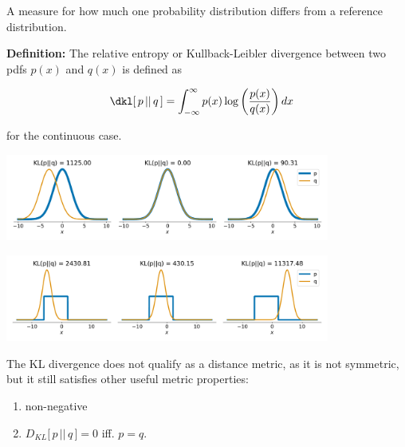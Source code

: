 \begin{frame}{\subsecname}

A measure for how much one probability distribution differs from a reference distribution. 

\textbf{Definition:} 
The relative entropy or Kullback-Leibler divergence between two pdfs $p(x)$ and $q(x)$ is defined as



\begin{align}
\label{eq:klcont}
\dkl\lbrack\,p\, ||\, q\,\rbrack 
&= \int_{-\infty}^{\infty} p(x) \log \left( \frac{p(x)}{q(x)} \right) dx
\end{align}

for the continuous case.

\end{frame}

\begin{frame}{\subsecname}

\begin{center}
	\includegraphics[width=0.8\textwidth]{img/kl_normal}
	
	\pause
	
	\includegraphics[width=0.8\textwidth]{img/kl_uniform_normal}
\end{center}

\pause 

The KL divergence does not qualify as a distance metric, as it is not symmetric, but it still satisfies other useful metric properties:
\begin{enumerate}
\item non-negative
\item $D_{KL}\lbrack\,p\, ||\, q\,\rbrack = 0$ iff. $p = q$.
\end{enumerate}


\end{frame}


